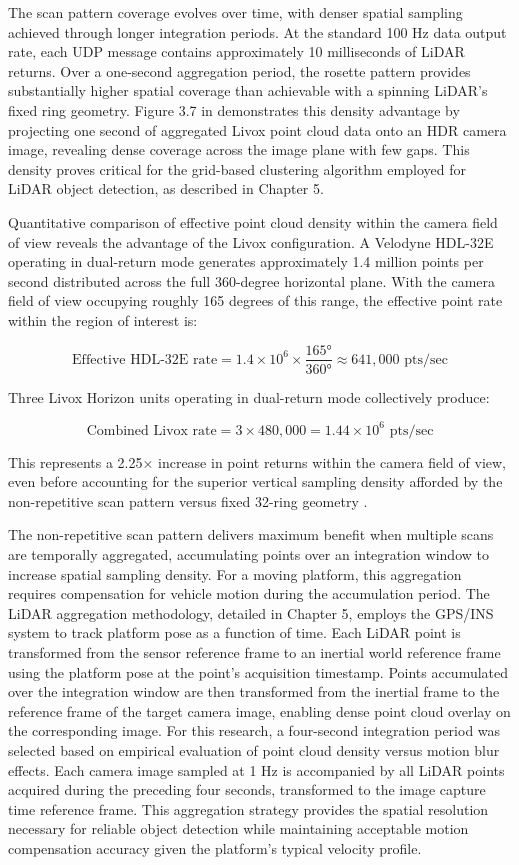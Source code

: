 \documentclass{erauthesis}
\begin{document}
The scan pattern coverage evolves over time, with denser spatial sampling achieved through longer integration periods.
At the standard 100 Hz data output rate, each UDP message contains approximately 10 milliseconds of \ac{LiDAR} returns.
Over a one-second aggregation period, the rosette pattern provides substantially higher spatial coverage than achievable with a spinning \ac{LiDAR}'s fixed ring geometry.
Figure 3.7 in \cite{thompson2023} demonstrates this density advantage by projecting one second of aggregated Livox point cloud data onto an \ac{HDR} camera image, revealing dense coverage across the image plane with few gaps.
This density proves critical for the grid-based clustering algorithm employed for \ac{LiDAR} object detection, as described in Chapter 5.

Quantitative comparison of effective point cloud density within the camera field of view reveals the advantage of the Livox configuration.
A Velodyne HDL-32E operating in dual-return mode generates approximately 1.4 million points per second distributed across the full 360-degree horizontal plane.
With the camera field of view occupying roughly 165 degrees of this range, the effective point rate within the region of interest is:

$$\text{Effective HDL-32E rate} = 1.4 \times 10^6 \times \frac{165°}{360°} \approx 641,000 \text{ pts/sec}$$

Three Livox Horizon units operating in dual-return mode collectively produce:

$$\text{Combined Livox rate} = 3 \times 480,000 = 1.44 \times 10^6 \text{ pts/sec}$$

This represents a 2.25× increase in point returns within the camera field of view, even before accounting for the superior vertical sampling density afforded by the non-repetitive scan pattern versus fixed 32-ring geometry \cite{thompson2023}.

The non-repetitive scan pattern delivers maximum benefit when multiple scans are temporally aggregated, accumulating points over an integration window to increase spatial sampling density.
For a moving platform, this aggregation requires compensation for vehicle motion during the accumulation period.
The \ac{LiDAR} aggregation methodology, detailed in Chapter 5, employs the \ac{GPS}/\ac{INS} system to track platform pose as a function of time.
Each \ac{LiDAR} point is transformed from the sensor reference frame to an inertial world reference frame using the platform pose at the point's acquisition timestamp.
Points accumulated over the integration window are then transformed from the inertial frame to the reference frame of the target camera image, enabling dense point cloud overlay on the corresponding image.
For this research, a four-second integration period was selected based on empirical evaluation of point cloud density versus motion blur effects.
Each camera image sampled at 1 Hz is accompanied by all \ac{LiDAR} points acquired during the preceding four seconds, transformed to the image capture time reference frame.
This aggregation strategy provides the spatial resolution necessary for reliable object detection while maintaining acceptable motion compensation accuracy given the platform's typical velocity profile.
\end{document}
